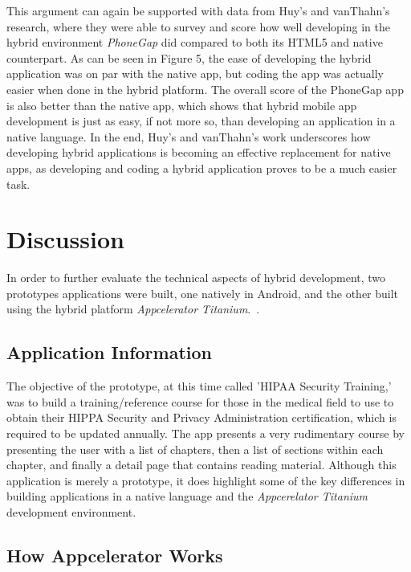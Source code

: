 \documentclass[11pt, twocolumn]{article}
\begin{document}
This argument can again be supported with data from Huy's and vanThahn's research, where they were able to survey and score how well developing in the hybrid environment {\it PhoneGap} did compared to both its HTML5 and native counterpart.  As can be seen in Figure 5, the ease of developing the hybrid application was on par with the native app, but coding the app was actually easier when done in the hybrid platform.  The overall score of the PhoneGap app is also better than the native app, which shows that hybrid mobile app development is just as easy, if not more so, than developing an application in a native language.  In the end, Huy's and vanThahn's work underscores how developing hybrid applications is becoming an effective replacement for native apps, as developing and coding a hybrid application proves to be a much easier task.\\


\section{Discussion}
In order to further evaluate the technical aspects of hybrid development, two prototypes applications were built, one natively in Android, and the other built using the hybrid platform {\it Appcelerator Titanium}.~\cite{Appcelerator}.\\

\subsection{Application Information}

The objective of the prototype, at this time called 'HIPAA Security Training,' was to build a training/reference course for those in the medical field to use to obtain their HIPPA Security and Privacy Administration certification, which is required to be updated annually.  The app presents a very rudimentary course by presenting the user with a list of chapters, then a list of sections within each chapter, and finally a detail page that contains reading material.  Although this application is merely a prototype, it does highlight some of the key differences in building applications in a native language and the {\it Appcerelator Titanium} development environment.

\subsection{How Appcelerator Works}
\end{document}
